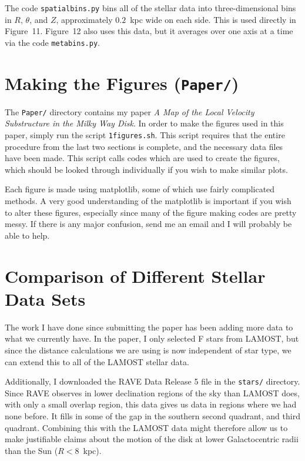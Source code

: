 \documentclass{article}
\begin{document}
The code \texttt{spatialbins.py} bins all of the stellar data into three-dimensional bins in $R$, $\theta$, and $Z$, approximately $0.2$~kpc wide on each side. This is used directly in Figure~11. Figure~12 also uses this data, but it averages over one axis at a time via the code \texttt{metabins.py}.

\section{Making the Figures (\texttt{Paper/})}

The \texttt{Paper/} directory contains my paper \textit{A Map of the Local Velocity Substructure in the Milky Way Disk}. In order to make the figures used in this paper, simply run the script \texttt{1figures.sh}. This script requires that the entire procedure from the last two sections is complete, and the necessary data files have been made. This script calls codes which are used to create the figures, which should be looked through individually if you wish to make similar plots.

Each figure is made using matplotlib, some of which use fairly complicated methods. A very good understanding of the matplotlib is important if you wish to alter these figures, especially since many of the figure making codes are pretty messy. If there is any major confusion, send me an email and I will probably be able to help.

\section{Comparison of Different Stellar Data Sets} \label{sec:futurework}

The work I have done since submitting the paper has been adding more data to what we currently have. In the paper, I only selected F stars from LAMOST, but since the distance calculations we are using is now independent of star type, we can extend this to all of the LAMOST stellar data.

Additionally, I downloaded the RAVE Data Release 5 file in the \texttt{stars/} directory. Since RAVE observes in lower declination regions of the sky than LAMOST does, with only a small overlap region, this data gives us data in regions where we had none before. It fills in some of the gap in the southern second quadrant, and third quadrant. Combining this with the LAMOST data might therefore allow us to make justifiable claims about the motion of the disk at lower Galactocentric radii than the Sun ($R<8$~kpc).
\end{document}
